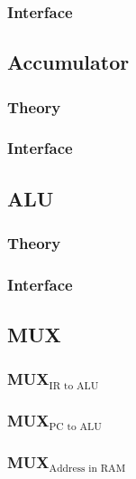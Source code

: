 \documentclass[11pt]{article}
\begin{document}
\subsubsection{Interface}
\label{sec:org4e896dd}
\subsection{Accumulator}
\label{sec:orgef816b7}
\subsubsection{Theory}
\label{sec:org807d4ac}
\subsubsection{Interface}
\label{sec:orgbb35bc3}
\subsection{ALU}
\label{sec:orgcd08a89}
\subsubsection{Theory}
\label{sec:orgbe2a14b}
\subsubsection{Interface}
\label{sec:org758eb12}
\subsection{MUX}
\label{sec:org1b2f18e}
\subsubsection{MUX\(_{\text{IR to ALU}}\)}
\label{sec:org65f91b5}
\subsubsection{MUX\(_{\text{PC to ALU}}\)}
\label{sec:org9044cd8}
\subsubsection{MUX\(_{\text{Address in RAM}}\)}
\label{sec:org09190c9}
\end{document}
